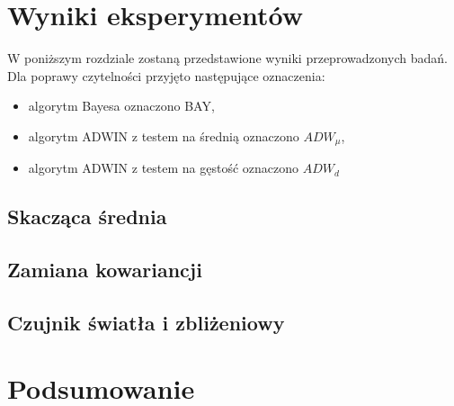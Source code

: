 \section{Wyniki eksperymentów}
W poniższym rozdziale zostaną przedstawione wyniki przeprowadzonych badań.
Dla poprawy czytelności przyjęto następujące oznaczenia:
\begin{itemize}
  \item algorytm Bayesa oznaczono BAY,
  \item algorytm ADWIN z testem na średnią oznaczono $ADW_{\mu}$,
  \item algorytm ADWIN z testem na gęstość oznaczono $ADW_{d}$
\end{itemize}

\subsection{Skacząca średnia}

\newpage
\subsection{Zamiana kowariancji}

\subsection{Czujnik światła i zbliżeniowy}

\section{Podsumowanie}
